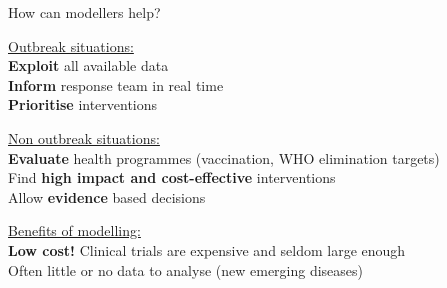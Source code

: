 \documentclass[table]{beamer}\usepackage[]{graphicx}\usepackage[]{color}
\begin{document}
\begin{frame}[fragile]{How can modellers help?}

\underline{Outbreak situations:} \\
\vspace{0.1cm}
\hspace{0.5cm} \textbf{Exploit} all available data \\
\vspace{0.1cm}
\hspace{0.5cm} \textbf{Inform} response team in real time \\
\vspace{0.1cm}
\hspace{0.5cm} \textbf{Prioritise} interventions \\
\vspace{0.3cm}

\underline{Non outbreak situations:} \\
\vspace{0.1cm}
\hspace{0.5cm} \textbf{Evaluate} health programmes (vaccination, WHO elimination targets) \\ %
\vspace{0.1cm}
\hspace{0.5cm} Find \textbf{high impact and cost-effective} interventions \\
\vspace{0.1cm}
\hspace{0.5cm} Allow \textbf{evidence} based decisions \\
\vspace{0.3cm}

\underline{Benefits of modelling:} \\
\vspace{0.1cm}
\hspace{0.5cm} \textbf{Low cost!} Clinical trials are expensive and seldom large enough \\
\vspace{0.1cm}
\hspace{0.5cm} Often little or no data to analyse (new emerging diseases) \\ %
\vspace{0.3cm}



\end{frame}
\end{document}
